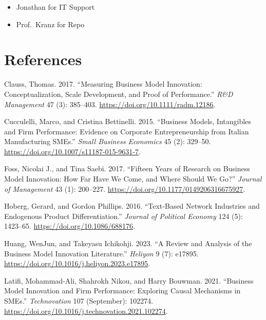\documentclass[
]{article}
\providecommand{\tightlist}{%
  \setlength{\itemsep}{0pt}\setlength{\parskip}{0pt}}\usepackage{longtable,booktabs,array}
\newlength{\cslhangindent}
\newenvironment{CSLReferences}[2] %
 {\begin{list}{}{%
  \setlength{\itemindent}{0pt}
  \setlength{\leftmargin}{0pt}
  \setlength{\parsep}{0pt}
  \ifodd #1
   \setlength{\leftmargin}{\cslhangindent}
   \setlength{\itemindent}{-1\cslhangindent}
  \fi
  \setlength{\itemsep}{#2\baselineskip}}}
 {\end{list}}
\begin{document}
\begin{itemize}
\tightlist
\item
  Jonathan for IT Support
\item
  Prof.~Kranz for Repo
\end{itemize}

\newpage{}

\section{References}\label{references}

\label{refs}
\begin{CSLReferences}{1}{0}
Clauss, Thomas. 2017. {``Measuring Business Model Innovation:
Conceptualization, Scale Development, and Proof of Performance.''}
\emph{R\&D Management} 47 (3): 385--403.
\url{https://doi.org/10.1111/radm.12186}.

Cucculelli, Marco, and Cristina Bettinelli. 2015. {``Business Models,
Intangibles and Firm Performance: Evidence on Corporate Entrepreneurship
from {Italian} Manufacturing {SMEs}.''} \emph{Small Business Economics}
45 (2): 329--50. \url{https://doi.org/10.1007/s11187-015-9631-7}.

Foss, Nicolai J., and Tina Saebi. 2017. {``Fifteen {Years} of {Research}
on {Business} {Model} {Innovation}: {How} {Far} {Have} {We} {Come}, and
{Where} {Should} {We} {Go}?''} \emph{Journal of Management} 43 (1):
200--227. \url{https://doi.org/10.1177/0149206316675927}.

Hoberg, Gerard, and Gordon Phillips. 2016. {``Text-{Based} {Network}
{Industries} and {Endogenous} {Product} {Differentiation}.''}
\emph{Journal of Political Economy} 124 (5): 1423--65.
\url{https://doi.org/10.1086/688176}.

Huang, WenJun, and Takeyasu Ichikohji. 2023. {``A Review and Analysis of
the Business Model Innovation Literature.''} \emph{Heliyon} 9 (7):
e17895. \url{https://doi.org/10.1016/j.heliyon.2023.e17895}.

Latifi, Mohammad-Ali, Shahrokh Nikou, and Harry Bouwman. 2021.
{``Business Model Innovation and Firm Performance: {Exploring} Causal
Mechanisms in {SMEs}.''} \emph{Technovation} 107 (September): 102274.
\url{https://doi.org/10.1016/j.technovation.2021.102274}.


\end{CSLReferences}
\end{document}
